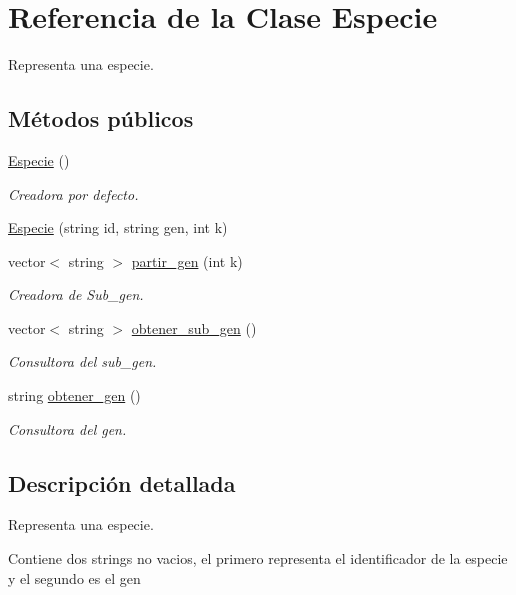 \hypertarget{class_especie}{}\section{Referencia de la Clase Especie}
\label{class_especie}


Representa una especie.  


\subsection*{Métodos públicos}
\begin{DoxyCompactItemize}
\item 
\hyperlink{class_especie_a272c2488719cc9874b2f174906675b3d}{Especie} ()
\begin{DoxyCompactList}\small\item\em Creadora por defecto. \end{DoxyCompactList}\item 
\hyperlink{class_especie_ac00e224134b1fd6e12ab653b71fd142d}{Especie} (string id, string gen, int k)
\item 
vector$<$ string $>$ \hyperlink{class_especie_a68f3f4274cf4f763a03e6cc0d633f25e}{partir\+\_\+gen} (int k)
\begin{DoxyCompactList}\small\item\em Creadora de Sub\+\_\+gen. \end{DoxyCompactList}\item 
vector$<$ string $>$ \hyperlink{class_especie_a550a75c9df1055a7c14051efaed2d628}{obtener\+\_\+sub\+\_\+gen} ()
\begin{DoxyCompactList}\small\item\em Consultora del sub\+\_\+gen. \end{DoxyCompactList}\item 
string \hyperlink{class_especie_abcbabd759ef608ce6901f8348dfca906}{obtener\+\_\+gen} ()
\begin{DoxyCompactList}\small\item\em Consultora del gen. \end{DoxyCompactList}\end{DoxyCompactItemize}


\subsection{Descripción detallada}
Representa una especie. 

Contiene dos strings no vacios, el primero representa el identificador de la especie y el segundo es el gen 

